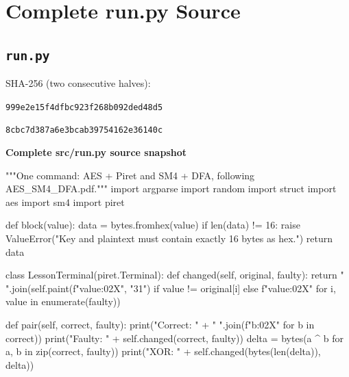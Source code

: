 \ifnum{}\relax\else\appendix\fi
\chapter{Complete run.py Source}
\section{\texttt{run.py}}\label{source:run}
\noindent SHA-256 (two consecutive halves):\par
\texttt{999e2e15f4dfbc923f268b092ded48d5}\par
\texttt{8cbc7d387a6e3bcab39754162e36140c}\par
\par\smallskip\noindent\textbf{Complete src/run.py source snapshot}\par
\begin{lightcode}[numbers=left,firstnumber=1]
"""One command: AES + Piret and SM4 + DFA, following AES_SM4_DFA.pdf."""
import argparse
import random
import struct
import aes
import sm4
import piret


def block(value):
    data = bytes.fromhex(value)
    if len(data) != 16:
        raise ValueError("Key and plaintext must contain exactly 16 bytes as hex.")
    return data


class LessonTerminal(piret.Terminal):
    def changed(self, original, faulty):
        return " ".join(self.paint(f"{value:02X}", "31") if value != original[i] else f"{value:02X}" for i, value in enumerate(faulty))

    def pair(self, correct, faulty):
        print("Correct: " + " ".join(f"{b:02X}" for b in correct))
        print("Faulty:  " + self.changed(correct, faulty))
        delta = bytes(a ^ b for a, b in zip(correct, faulty))
        print("XOR:     " + self.changed(bytes(len(delta)), delta))



\end{lightcode}
